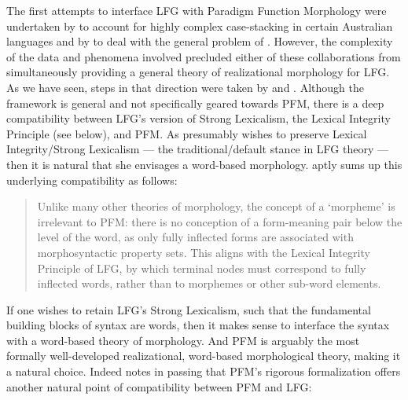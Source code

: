 \documentclass[output=paper,hidelinks]{langscibook}
\begin{document}
The first attempts to interface LFG with Paradigm Function Morphology
\citep{Stu01,stump16,spencer13} were undertaken by
\citet{sadler-nordlinger2004,SadlNord2006} to account for highly
complex case-stacking in certain Australian languages and by
\citet{ackerman;stump04} to deal with the general problem of
. However, the complexity of the data and
phenomena involved 
precluded either of these collaborations from simultaneously providing
a general theory of realizational morphology for LFG. As we have seen,
steps in that direction were taken by \citet{dalrymple15} and
\citet{DLM:LFG}. Although the \citeauthor{dalrymple15} framework is
general and not specifically geared towards PFM, there is a deep
compatibility between LFG's version of Strong Lexicalism, the Lexical
Integrity Principle (see  below), and PFM. 
As \citet{dalrymple15} presumably wishes
to preserve Lexical Integrity/Strong Lexicalism --- the traditional/default stance
in LFG theory --- then it is natural that she envisages a word-based
morphology. \citet[22]{thomas21} aptly sums up this underlying
compatibility as follows:
%
\begin{quote}
  Unlike many other theories of morphology, the concept of a
  `morpheme' is irrelevant to PFM: there is no conception of a
  form-meaning pair below the level of the word, as only fully
  inflected forms are associated with morphosyntactic property
  sets. This aligns with the Lexical Integrity Principle of LFG, by
  which terminal nodes must correspond to fully inflected words,
  rather than to morphemes or other sub-word elements.
\end{quote}
%
If one wishes to retain LFG's Strong Lexicalism, such
that the fundamental building blocks of syntax are words, then it
makes sense to interface the syntax with a word-based theory of
morphology. And PFM is arguably the most formally well-developed
realizational, word-based morphological theory, making it a
natural choice. Indeed \citet[23]{thomas21} notes in passing that
PFM's rigorous formalization offers another natural point of
compatibility between PFM and LFG:  
\end{document}
